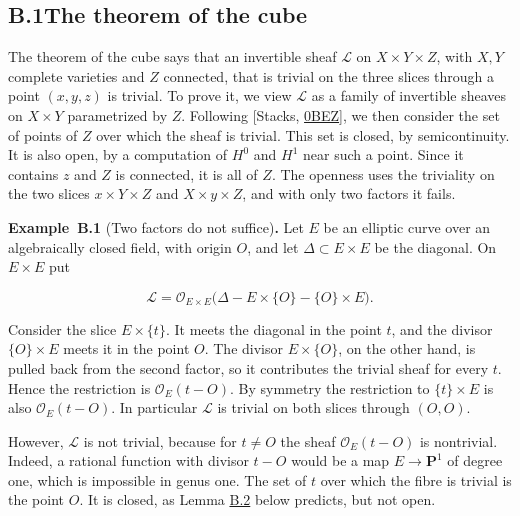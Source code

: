 \documentclass[11pt]{article}
\newenvironment{bpstatement}[2]{\par\addvspace{0.6\baselineskip}\noindent\textbf{#1}#2\textbf{.}\enspace\ignorespaces}
  {\par\addvspace{0.4\baselineskip}}
\begin{document}
\subsection*{\texorpdfstring{B.1\quad The theorem of the cube}{B.1 The theorem of the cube}}
\label{bp77}%
\label{bp78}%
The theorem of the cube says that an invertible sheaf \(\mathcal L\) on \(X\times Y\times Z\), with \(X,Y\) complete varieties and \(Z\) connected, that is trivial on the three slices through a point \((x,y,z)\) is trivial. To prove it, we view \(\mathcal L\) as a family of invertible sheaves on \(X\times Y\) parametrized by \(Z\). Following [Stacks, \href{https://stacks.math.columbia.edu/tag/0BEZ}{0BEZ}], we then consider the set of points of \(Z\) over which the sheaf is trivial. This set is closed, by semicontinuity. It is also open, by a computation of \(H^0\) and \(H^1\) near such a point. Since it contains \(z\) and \(Z\) is connected, it is all of \(Z\). The openness uses the triviality on the two slices \(x\times Y\times Z\) and \(X\times y\times Z\), and with only two factors it fails.

\label{bp79}%
\begin{bpstatement}{Example~B.1}{ (Two factors do not suffice)}
Let \(E\) be an elliptic curve over an algebraically closed field, with origin \(O\), and let \(\Delta\subset E\times E\) be the diagonal. On \(E\times E\) put

\[
\mathcal L=\mathcal O_{E\times E}\bigl(\Delta-E\times\{O\}-\{O\}\times E\bigr).
\]

Consider the slice \(E\times\{t\}\). It meets the diagonal in the point \(t\), and the divisor \(\{O\}\times E\) meets it in the point \(O\). The divisor \(E\times\{O\}\), on the other hand, is pulled back from the second factor, so it contributes the trivial sheaf for every \(t\). Hence the restriction is \(\mathcal O_E(t-O)\). By symmetry the restriction to \(\{t\}\times E\) is also \(\mathcal O_E(t-O)\). In particular \(\mathcal L\) is trivial on both slices through \((O,O)\).

However, \(\mathcal L\) is not trivial, because for \(t\neq O\) the sheaf \(\mathcal O_E(t-O)\) is nontrivial. Indeed, a rational function with divisor \(t-O\) would be a map \(E\to\mathbf P^1\) of degree one, which is impossible in genus one. The set of \(t\) over which the fibre is trivial is the point \(O\). It is closed, as Lemma \hyperref[bp80]{B.2} below predicts, but not open.
\end{bpstatement}
\end{document}
